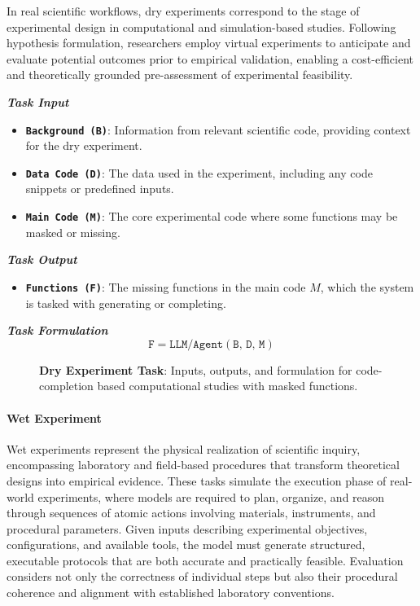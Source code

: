 In real scientific workflows, dry experiments correspond to the stage of experimental design in computational and simulation-based studies. Following hypothesis formulation, researchers employ virtual experiments to anticipate and evaluate potential outcomes prior to empirical validation, enabling a cost-efficient and theoretically grounded pre-assessment of experimental feasibility.

\begin{tcolorbox}[
    breakable,
    title=Task Definition of Dry Experiment,
    colback=LighterGray,
    colframe=DeepPurple,
    colbacktitle=DeepPurple,
    coltitle=White
]
\textbf{\emph{\textcolor{DeepPurple}{Task Input}}}
\begin{itemize}
    \item \texttt{\textbf{Background (B)}}: Information from relevant scientific code, providing context for the dry experiment.
    \item \texttt{\textbf{Data Code (D)}}: The data used in the experiment, including any code snippets or predefined inputs.
    \item \texttt{\textbf{Main Code (M)}}: The core experimental code where some functions may be masked or missing.
\end{itemize}

\textbf{\emph{\textcolor{DeepPurple}{Task Output}}}
\begin{itemize}
    \item \texttt{\textbf{Functions (F)}}: The missing functions in the main code \( M \), which the system is tasked with generating or completing.
\end{itemize}

\textbf{\emph{\textcolor{DeepPurple}{Task Formulation}}}
\[
\texttt{F} = \texttt{LLM/Agent}(\texttt{B, D, M})
\]
\end{tcolorbox}

\begin{figure}[ht]
    \vspace{0.01cm}
    \caption{\textbf{Dry Experiment Task}: Inputs, outputs, and formulation for code-completion based computational studies with masked functions.}
    \label{fig:Task Definition of Dry Experiment}
\end{figure}

\paragraph{Wet Experiment}
Wet experiments represent the physical realization of scientific inquiry, encompassing laboratory and field-based procedures that transform theoretical designs into empirical evidence. These tasks simulate the execution phase of real-world experiments, where models are required to plan, organize, and reason through sequences of atomic actions involving materials, instruments, and procedural parameters. Given inputs describing experimental objectives, configurations, and available tools, the model must generate structured, executable protocols that are both accurate and practically feasible. Evaluation considers not only the correctness of individual steps but also their procedural coherence and alignment with established laboratory conventions.

